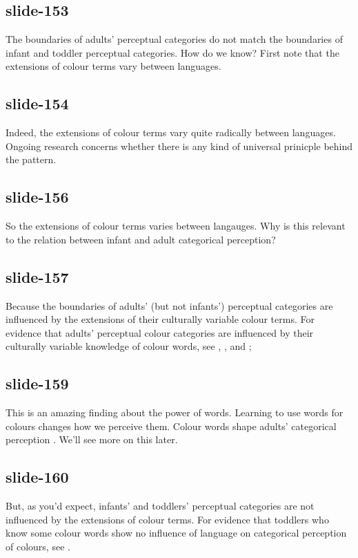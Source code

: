 \documentclass[12pt,\papersize]{extarticle}
\begin{document}
 
\subsection{slide-153}
The boundaries of adults' perceptual categories do not match the boundaries of infant and toddler perceptual categories.
How do we know?
First note that the extensions of colour terms vary between languages.
 
 
\subsection{slide-154}
Indeed, the extensions of colour terms vary quite radically between languages.
Ongoing research concerns whether there is any kind of universal prinicple behind the pattern.
 
 
\subsection{slide-156}
So the extensions of colour terms varies between langauges.
Why is this relevant to the relation between infant and adult categorical perception?
 
 
\subsection{slide-157}
Because the boundaries of adults' (but not infants') perceptual categories are influenced by the extensions of their culturally variable colour terms.
For evidence that adults' perceptual colour categories are influenced by their culturally variable knowledge of colour words, see \citet{Kay:2006ly}, \citet{Roberson:2007wg}, and \citet{Winawer:2007im};
 
 
\subsection{slide-159}
This is an amazing finding about the power of words.
Learning to use words for colours changes how we perceive them.
Colour words shape adults’ categorical perception \citep{Roberson:2007wg,Winawer:2007im}.
We'll see more on this later.
 
 
\subsection{slide-160}
But, as you'd expect, infants’ and toddlers’ perceptual categories are not influenced by the extensions of colour terms.
For evidence that toddlers who know some colour words show no influence of language on categorical perception of colours, see \citet{Franklin:2005hp}.
 
\end{document}
